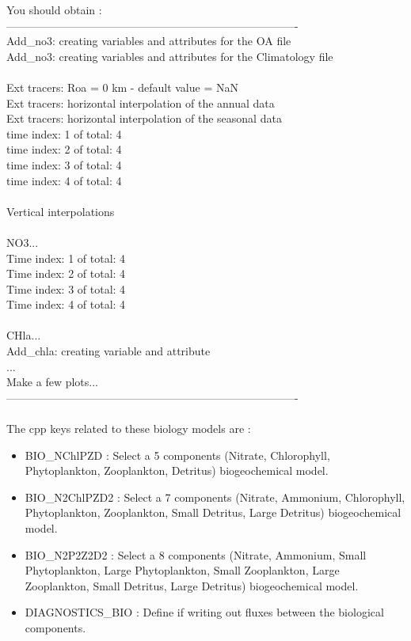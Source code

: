 You should obtain :\\
-------------------------------------------------------------------------------\\
Add\_no3: creating variables and attributes for the OA file\\
Add\_no3: creating variables and attributes for the Climatology file\\
\\ 
 Ext tracers: Roa = 0 km - default value = NaN\\
 Ext tracers: horizontal interpolation of the annual data\\
 Ext tracers: horizontal interpolation of the seasonal data\\
time index: 1 of total: 4\\
time index: 2 of total: 4\\
time index: 3 of total: 4\\
time index: 4 of total: 4\\
 \\
 Vertical interpolations\\
 \\
 NO3...\\
 Time index: 1 of total: 4\\
 Time index: 2 of total: 4\\
 Time index: 3 of total: 4\\
 Time index: 4 of total: 4\\
 \\
 CHla...\\
Add\_chla: creating variable and attribute\\
...\\
Make a few plots...\\
-------------------------------------------------------------------------------\\\\
The cpp keys related to these biology models are :
\begin{itemize}
\item BIO\_NChlPZD : Select a 5 components (Nitrate, Chlorophyll, Phytoplankton, 
Zooplankton, Detritus) biogeochemical model.
\item BIO\_N2ChlPZD2 : Select a 7 components (Nitrate, Ammonium, Chlorophyll, 
Phytoplankton, Zooplankton, Small Detritus, Large Detritus) biogeochemical model. 
\item BIO\_N2P2Z2D2 : Select a 8 components (Nitrate, Ammonium, Small  
Phytoplankton, Large Phytoplankton, Small Zooplankton, Large Zooplankton,
Small Detritus, Large Detritus) biogeochemical model. 
\item DIAGNOSTICS\_BIO : Define if writing out fluxes between the biological
components.\\
\end{itemize}



